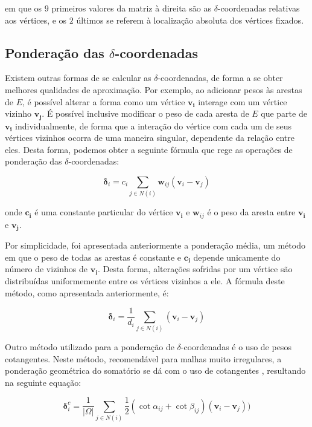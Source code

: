 \noindent em que os $9$ primeiros valores da matriz à direita são as $\delta$-coordenadas relativas aos vértices, e os $2$ últimos se referem à localização absoluta dos vértices fixados.

\subsection{Ponderação das $\delta$-coordenadas}
\label{Pondera}

Existem outras formas de se calcular as $\delta$-coordenadas, de forma a se obter melhores qualidades de aproximação. Por exemplo, ao adicionar pesos às arestas de $E$, é possível alterar a forma como um vértice $\mathbf{v_i}$ interage com um vértice vizinho $\mathbf{v_j}$. É possível inclusive modificar o peso de cada aresta de $E$ que parte de $\mathbf{v_i}$ individualmente, de forma que a interação do vértice com cada um de seus vértices vizinhos ocorra de uma maneira singular, dependente da relação entre eles. Desta forma, podemos obter a seguinte fórmula que rege as operações de ponderação das $\delta$-coordenadas:

\begin{equation}
\mathbf{\delta}_i = {c_i} \sum_{j \in N(i)} \mathbf{w}_{ij}(\mathbf{v}_i - \mathbf{v}_j)
\label{eq_forpon}
\end{equation}

\noindent onde $\mathbf{c_i}$ é uma constante particular do vértice $\mathbf{v_i}$ e $\mathbf{w}_{ij}$ é o peso da aresta entre $\mathbf{v_i}$ e $\mathbf{v_j}$.

 Por simplicidade, foi apresentada anteriormente a ponderação média, um método em que o peso de todas as arestas é constante e $\mathbf{c_i}$ depende unicamente do número de vizinhos de $\mathbf{v_i}$. Desta forma, alterações sofridas por um vértice são distribuídas uniformemente entre os vértices vizinhos a ele. A fórmula deste método, como apresentada anteriormente, é: 

\begin{equation}
    \mathbf{\delta}_i = \frac{1}{d_i} \sum_{j \in N(i)} (\mathbf{v}_i - \mathbf{v}_j)
\end{equation}

Outro método utilizado para a ponderação de $\delta$-coordenadas é o uso de pesos cotangentes. Neste método, recomendável para malhas muito irregulares, a ponderação geométrica do somatório se dá com o uso de cotangentes \cite{pinkall:1996}, resultando na seguinte equação:

\begin{equation}
	\mathbf{\delta}_i^c = \frac{1}{|\Omega|} \sum_{j \in N(i)} \frac{1}{2} (\cot \alpha_{ij} + \cot \beta_{ij})(\mathbf{v}_i - \mathbf{v}_j))
\end{equation}

